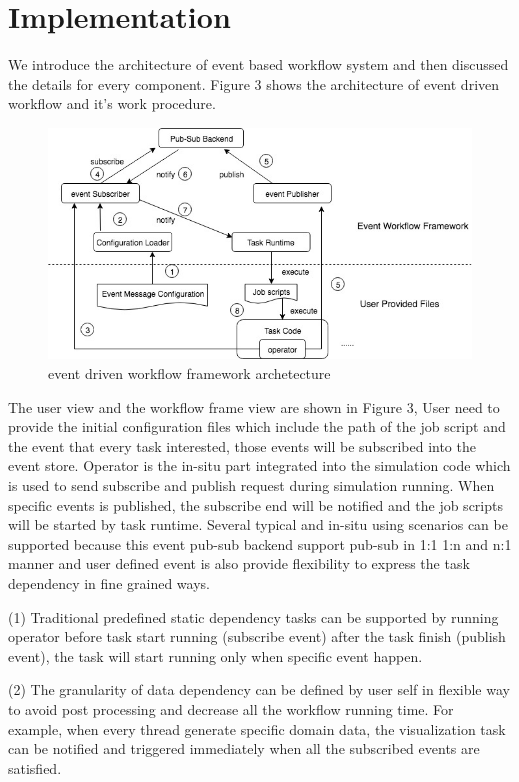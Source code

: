 
\section{Implementation}
We introduce the architecture of event based workflow system and then discussed the details for every component. Figure 3 shows the architecture of  event driven workflow and it's work procedure.

\begin{figure} 
\centering
\includegraphics[width=.8\linewidth]{./figure/edflowarchitecture.jpg}
\caption{event driven workflow framework archetecture}
 \label{fg:state}
\end{figure} 


The user view and the workflow frame view are shown in Figure 3,  User need to provide the initial configuration files which include the path of the job script and the event  that every task interested, those events will be subscribed into the event store. Operator is the in-situ part integrated into the simulation code which is used to send subscribe and publish request during simulation running. When specific events is published, the subscribe end will be notified and the job scripts will be started by task runtime. Several typical and in-situ using scenarios can be supported because this event pub-sub backend support pub-sub in 1:1 1:n and n:1 manner and user defined event is also provide flexibility to express the task dependency in fine grained ways. 

(1) Traditional predefined static dependency tasks can be supported by running operator before task start running (subscribe event) after the task finish (publish event), the task will start running only when specific event happen.

(2) The granularity of data dependency can be defined by user self in flexible way to avoid post processing and decrease all the workflow running time. For example, when every thread generate specific domain data, the visualization task can be notified and triggered immediately when all the subscribed events are satisfied.


